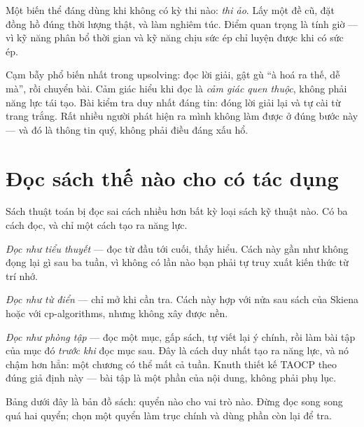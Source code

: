 \documentclass[../../algorithm.tex]{subfiles}
\begin{document}
Một biến thể đáng dùng khi không có kỳ thi nào: \emph{thi ảo}. Lấy một đề cũ, đặt đồng hồ đúng thời lượng thật, và làm nghiêm túc. Điểm quan trọng là tính giờ --- vì kỹ năng phân bổ thời gian và kỹ năng chịu sức ép chỉ luyện được khi có sức ép.

\begin{cambay}
Cạm bẫy phổ biến nhất trong upsolving: đọc lời giải, gật gù ``à hoá ra thế, dễ mà'', rồi chuyển bài. Cảm giác hiểu khi đọc là \emph{cảm giác quen thuộc}, không phải năng lực tái tạo. Bài kiểm tra duy nhất đáng tin: đóng lời giải lại và tự cài từ trang trắng. Rất nhiều người phát hiện ra mình không làm được ở đúng bước này --- và đó là thông tin quý, không phải điều đáng xấu hổ.
\end{cambay}

\section{Đọc sách thế nào cho có tác dụng}

Sách thuật toán bị đọc sai cách nhiều hơn bất kỳ loại sách kỹ thuật nào. Có ba cách đọc, và chỉ một cách tạo ra năng lực.

\emph{Đọc như tiểu thuyết} --- đọc từ đầu tới cuối, thấy hiểu. Cách này gần như không đọng lại gì sau ba tuần, vì không có lần nào bạn phải tự truy xuất kiến thức từ trí nhớ.

\emph{Đọc như từ điển} --- chỉ mở khi cần tra. Cách này hợp với nửa sau sách của Skiena hoặc với cp-algorithms, nhưng không xây được nền.

\emph{Đọc như phòng tập} --- đọc một mục, gấp sách, tự viết lại ý chính, rồi làm bài tập của mục đó \emph{trước khi} đọc mục sau. Đây là cách duy nhất tạo ra năng lực, và nó chậm hơn hẳn: một chương có thể mất cả tuần. Knuth thiết kế TAOCP theo đúng giả định này --- bài tập là một phần của nội dung, không phải phụ lục.

Bảng dưới đây là bản đồ sách: quyển nào cho vai trò nào. Đừng đọc song song quá hai quyển; chọn một quyển làm trục chính và dùng phần còn lại để tra.
\end{document}
